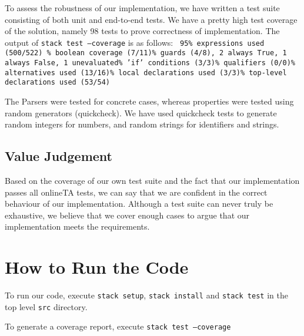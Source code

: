 \documentclass{article}
\begin{document}
To assess the robustness of our implementation, we have written a test suite consisting of both unit and end-to-end tests.
We have a pretty high test coverage of the solution, namely 98 tests to prove correctness of implementation. The output of \texttt{stack test --coverage} is as follows: \newline
\texttt{
	95\% expressions used (500/522) \% boolean coverage (7/11)\% guards (4/8), 2 always True, 1 always False, 1 unevaluated\% 'if' conditions (3/3)\% qualifiers (0/0)\% alternatives used (13/16)\% local declarations used (3/3)\% top-level declarations used (53/54)\newline
	}
	
The Parsers were tested for concrete cases, whereas properties were tested using random generators (quickcheck). We have used quickcheck tests to generate random integers for numbers, and random strings for identifiers and strings. 

\subsection{Value Judgement}
Based on the coverage of our own test suite and the fact that our implementation passes all onlineTA tests, we can say that we are confident in the correct behaviour of our implementation. Although a test suite can never truly be exhaustive, we believe that we cover enough cases to argue that our implementation meets the requirements.

\section{How to Run the Code}
To run our code, execute \texttt{stack setup}, \texttt{stack install} and \texttt{stack test} in the top level \texttt{src} directory.

To generate a coverage report, execute \texttt{stack test --coverage}
\end{document}
